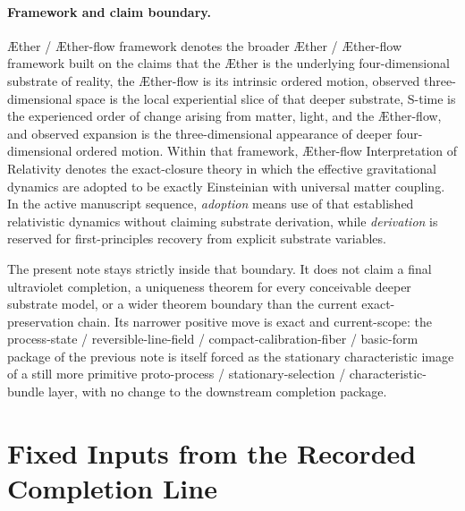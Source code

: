 \documentclass[11pt]{article}
\newcommand{\Aether}{\AE{}ther}
\newcommand{\Aflow}{\AE{}ther-flow}
\newcommand{\TheoryName}{\Aflow{} Interpretation of Relativity}
\newcommand{\TheoryProgram}{\Aether{} / \Aflow{} framework}
\begin{document}
\paragraph{Framework and claim boundary.}
\TheoryProgram{} denotes the broader \Aether{} / \Aflow{} framework built on the claims that the \Aether{} is the underlying four-dimensional substrate of reality, the \Aflow{} is its intrinsic ordered motion, observed three-dimensional space is the local experiential slice of that deeper substrate, S-time is the experienced order of change arising from matter, light, and the \Aflow{}, and observed expansion is the three-dimensional appearance of deeper four-dimensional ordered motion. Within that framework, \TheoryName{} denotes the exact-closure theory in which the effective gravitational dynamics are adopted to be exactly Einsteinian with universal matter coupling. In the active manuscript sequence, \emph{adoption} means use of that established relativistic dynamics without claiming substrate derivation, while \emph{derivation} is reserved for first-principles recovery from explicit substrate variables.

The present note stays strictly inside that boundary. It does not claim a final ultraviolet completion, a uniqueness theorem for every conceivable deeper substrate model, or a wider theorem boundary than the current exact-preservation chain. Its narrower positive move is exact and current-scope: the process-state / reversible-line-field / compact-calibration-fiber / basic-form package of the previous note is itself forced as the stationary characteristic image of a still more primitive proto-process / stationary-selection / characteristic-bundle layer, with no change to the downstream completion package.

\section{Fixed Inputs from the Recorded Completion Line}
\end{document}
